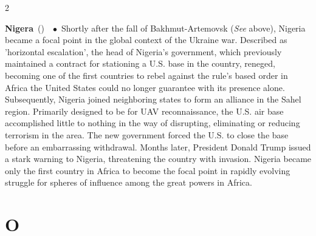 \documentclass[10pt,a4paper,twoside]{article} %
\newcommand{\entry}[4]{\markboth{#1}{#1}\textbf{#1}\ {(#2)}\ \textit{#3}\ $\bullet$\ {#4}}  %
\begin{document}
\begin{multicols}{2}
\entry{Nigera} {} {} {Shortly after the fall of Bakhmut-Artemovsk (\emph{See} above), Nigeria became a focal point in the global context of the Ukraine war. Described as 'horizontal escalation', the head of Nigeria's government, which previously maintained a contract for stationing a U.S. base in the country, reneged, becoming one of the first countries to rebel against the rule's based order in Africa the United States could no longer guarantee with its presence alone. Subsequently, Nigeria joined neighboring states to form an alliance in the  Sahel region. Primarily designed to be for UAV reconnaissance, the U.S. air base accomplished little to nothing in the way of disrupting, eliminating or reducing terrorism in the area. The new government forced the U.S. to close the base before an embarrassing withdrawal. Months later, President Donald Trump issued a stark warning to Nigeria, threatening the country with invasion. \newline \indent Nigeria became only the first country in Africa to become the focal point in rapidly evolving struggle for spheres of influence among the great powers in Africa. 
}

\end{multicols}


\section*{O}
\end{document}
